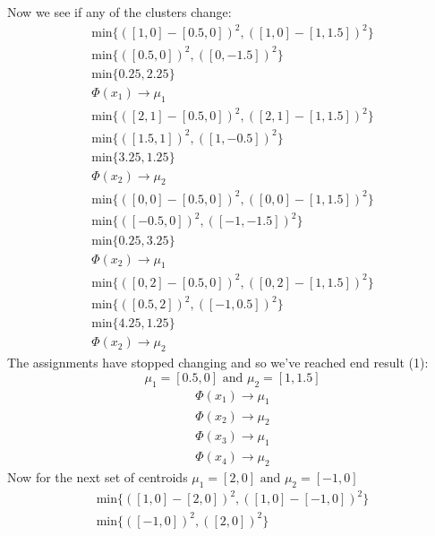 \documentclass[12pt]{article}
\begin{document}
\begin{enumerate}[label=(\alph*)]
			Now we see if any of the clusters change:
			\begin{gather*}
				\text{min} \{ ( [1,0] - [0.5, 0] )^2, ( [1,0] - [1, 1.5] )^2\} \\
				\text{min} \{ ( [0.5,0] )^2, ( [0, -1.5] )^2\} \\
				\text{min} \{ 0.25, 2.25\} \\
				\Phi(x_1) \rightarrow \mu_1
			\end{gather*}
			\begin{gather*}
				\text{min} \{ ( [2,1] - [0.5, 0] )^2, ( [2,1] - [1, 1.5] )^2\} \\
				\text{min} \{ ( [1.5,1] )^2, ( [1, -0.5] )^2\} \\
				\text{min} \{3.25, 1.25\} \\
				\Phi(x_2) \rightarrow \mu_2
			\end{gather*}
			\begin{gather*}
				\text{min} \{ ( [0,0] - [0.5, 0] )^2, ( [0,0] - [1, 1.5] )^2\} \\
				\text{min} \{ ( [-0.5,0] )^2, ( [-1, -1.5] )^2\} \\
				\text{min} \{ 0.25, 3.25\} \\
				\Phi(x_2) \rightarrow \mu_1
			\end{gather*}
			\begin{gather*}
				\text{min} \{ ( [0,2] - [0.5, 0] )^2, ( [0,2] - [1, 1.5] )^2\} \\
				\text{min} \{ ( [0.5,2] )^2, ( [-1, 0.5] )^2\} \\
				\text{min} \{ 4.25, 1.25\} \\
				\Phi(x_2) \rightarrow \mu_2
			\end{gather*}
			The assignments have stopped changing and so we've reached end result (1):
			\[
				\mu_1 = [0.5, 0] \text{ and } \mu_2 = [1, 1.5]
			\]
			\begin{gather*}
				\Phi(x_1) \rightarrow \mu_1 \\
				\Phi(x_2) \rightarrow \mu_2 \\
				\Phi(x_3) \rightarrow \mu_1 \\
				\Phi(x_4) \rightarrow \mu_2
			\end{gather*}
			Now for the next set of centroids
			\(\mu_1 = [2, 0] \text{ and } \mu_2 = [-1, 0]\)
			\begin{gather*}
				\text{min} \{ ( [1,0] - [2, 0] )^2, ( [1,0] - [-1, 0] )^2\} \\
				\text{min} \{ ( [-1,0] )^2, ( [2, 0] )^2\} \\

\end{gather*}
\end{enumerate}
\end{document}
